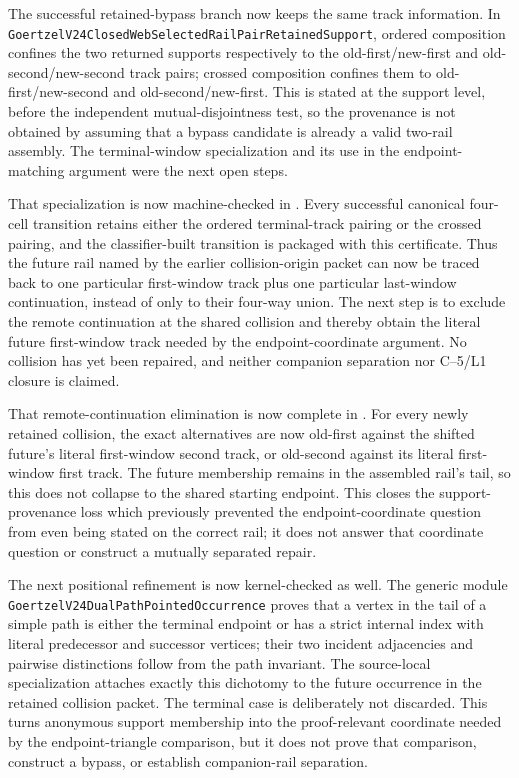 \documentclass[11pt]{article}
\theoremstyle{definition}
\begin{document}
The successful retained-bypass branch now keeps the same track information.
In
\texttt{GoertzelV24ClosedWebSelectedRailPairRetainedSupport}, ordered
composition confines the two returned supports respectively to the
old-first/new-first and old-second/new-second track pairs; crossed composition
confines them to old-first/new-second and old-second/new-first.  This is stated
at the support level, before the independent mutual-disjointness test, so the
provenance is not obtained by assuming that a bypass candidate is already a
valid two-rail assembly.  The terminal-window specialization and its use in
the endpoint-matching argument were the next open steps.

That specialization is now machine-checked in
.
Every successful canonical four-cell transition retains either the ordered
terminal-track pairing or the crossed pairing, and the classifier-built
transition is packaged with this certificate.  Thus the future rail named by
the earlier collision-origin packet can now be traced back to one particular
first-window track plus one particular last-window continuation, instead of
only to their four-way union.  The next step is to exclude the remote
continuation at the shared collision and thereby obtain the literal future
first-window track needed by the endpoint-coordinate argument.  No collision
has yet been repaired, and neither companion separation nor C--5/L1 closure is
claimed.

That remote-continuation elimination is now complete in
.
For every newly retained collision, the exact alternatives are now old-first
against the shifted future's literal first-window second track, or old-second
against its literal first-window first track.  The future membership remains
in the assembled rail's tail, so this does not collapse to the shared starting
endpoint.  This closes the support-provenance loss which previously prevented
the endpoint-coordinate question from even being stated on the correct rail;
it does not answer that coordinate question or construct a mutually separated
repair.

The next positional refinement is now kernel-checked as well.  The generic
module
\texttt{GoertzelV24DualPathPointedOccurrence} proves that a vertex in the tail
of a simple path is either the terminal endpoint or has a strict internal
index with literal predecessor and successor vertices; their two incident
adjacencies and pairwise distinctions follow from the path invariant.  The
source-local specialization
attaches exactly this dichotomy to the future occurrence in the retained
collision packet.  The terminal case is deliberately not discarded.  This
turns anonymous support membership into the proof-relevant coordinate needed
by the endpoint-triangle comparison, but it does not prove that comparison,
construct a bypass, or establish companion-rail separation.
\end{document}
